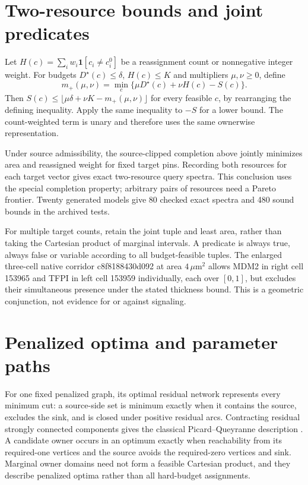 \documentclass[10pt,letterpaper]{article}
\newcommand{\ind}{\mathbf 1}\newcommand{\dist}{\operatorname{dist}}
\begin{document}
\section{Two-resource bounds and joint predicates}
Let $H(c)=\sum_i w_i\ind[c_i\ne c_i^0]$ be a reassignment count or nonnegative integer weight. For budgets $D^\star(c)\leq\delta$, $H(c)\leq K$ and multipliers $\mu,\nu\geq0$, define
\[
m_+(\mu,\nu)=\min_c\{\mu D^\star(c)+\nu H(c)-S(c)\}.
\]
Then $S(c)\leq\lfloor\mu\delta+\nu K-m_+(\mu,\nu)\rfloor$ for every feasible $c$, by rearranging the defining inequality. Apply the same inequality to $-S$ for a lower bound. The count-weighted term is unary and therefore uses the same ownerwise representation.

Under source admissibility, the source-clipped completion above jointly minimizes area and reassigned weight for fixed target pins. Recording both resources for each target vector gives exact two-resource query spectra. This conclusion uses the special completion property; arbitrary pairs of resources need a Pareto frontier. Twenty generated models give 80 checked exact spectra and 480 sound bounds in the archived tests.

For multiple target counts, retain the joint tuple and least area, rather than taking the Cartesian product of marginal intervals. A predicate is always true, always false or variable according to all budget-feasible tuples. The enlarged three-cell native corridor c8f8188430d092 at area $4\,\mu$m$^2$ allows MDM2 in right cell 153965 and TFPI in left cell 153959 individually, each over $[0,1]$, but excludes their simultaneous presence under the stated thickness bound. This is a geometric conjunction, not evidence for or against signaling.

\section{Penalized optima and parameter paths}
For one fixed penalized graph, its optimal residual network represents every minimum cut: a source-side set is minimum exactly when it contains the source, excludes the sink, and is closed under positive residual arcs. Contracting residual strongly connected components gives the classical Picard--Queyranne description \cite{picard}. A candidate owner occurs in an optimum exactly when reachability from its required-one vertices and the source avoids the required-zero vertices and sink. Marginal owner domains need not form a feasible Cartesian product, and they describe penalized optima rather than all hard-budget assignments.
\end{document}
